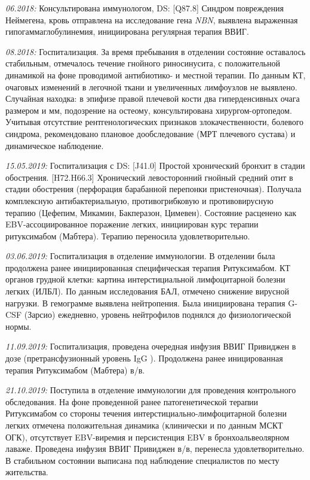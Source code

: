\documentclass[a4paper,14pt]{extarticle}
\newcommand{\gramm}{г}
\newcommand{\grammliter}{г/л}
\newcommand{\mugpkg}{мкг/кг}
\newcommand{\mg}{мг}
\newcommand{\mm}{мм}
\newcommand{\genename}[1]{\textit{#1}}
\newcommand{\pdate}[1]{\emph{#1:} }
\newcommand{\DS}[2]{[#2] #1}
\begin{document}
\pdate{06.2018} Консультирована иммунологом, DS: \DS{Синдром повреждения Неймегена}{Q87.8}, кровь отправлена на исследование гена \genename{NBN}, выявлена выраженная гипогаммаглобулинемия, инициирована регулярная терапия ВВИГ. 

\pdate{08.2018} Госпитализация. За время пребывания в отделении состояние оставалось стабильным, отмечалось течение гнойного риносинусита, с положительной динамикой на фоне проводимой антибиотико- и местной терапии. По данным КТ, очаговых изменений в легочной ткани и увеличенных лимфоузлов не выявлено. Случайная находка: в эпифизе правой плечевой кости два гиперденсивных очага размером \numprint[\mm]{5} и \numprint[\mm]{2} мм, подозрение на остеому, консультирована хирургом-ортопедом. Учитывая отсутствие рентгенологических признаков злокачественности, болевого синдрома, рекомендовано плановое дообследование (МРТ плечевого сустава) и динамическое наблюдение.

\pdate{15.05.2019} Госпитализация с DS: \DS{Простой хронический бронхит в стадии обострения}{J41.0}. \DS{Хронический левосторонний гнойный средний отит в стадии обострения (перфорация барабанной перепонки пристеночная)}{H72.H66.3}. Получала комплексную антибактериальную, противогрибковую и противовирусную терапию (Цефепим, Микамин, Бакперазон, Цимевен). Состояние расценено как EBV-ассоциированное поражение легких, инициирован курс терапии ритуксимабом (Мабтера). Терапию переносила удовлетворительно.

\pdate{03.06.2019} Госпитализация в отделение иммунологии. В отделении была продолжена ранее инициированная специфическая терапия Ритуксимабом. КТ органов грудной клетки: картина интерстициальной лимфоцитарной болезни легких (ИЛБЛ). По данным исследования БАЛ, отмечено снижение вирусной нагрузки. В гемограмме выявлена нейтропения. Была инициирована терапия G-CSF (Зарсио) \numprint[\mugpkg]{3} ежедневно, уровень нейтрофилов поднялся до физиологической нормы.

\pdate{11.09.2019} Госпитализация, проведена очередная инфузия ВВИГ Привиджен в дозе \numprint[\gramm]{10} (претрансфузионный уровень IgG \numprint[\grammliter]{5.8}). Продолжена ранее иницированная терапия Ритуксимабом (Мабтера) \numprint[\mg]{250} в/в. 

\pdate{21.10.2019} Поступила в отделение иммунологии для проведения контрольного обследования. На фоне проведенной ранее патогенетической терапии Ритуксимабом со стороны течения интерстициально\hyp{}лимфоцитарной болезни легких отмечена положительная динамика (клинически и по данным МСКТ ОГК), отсутствует EBV-виремия и персистенция EBV в бронхоальвеолярном лаваже. Проведена инфузия ВВИГ Привиджен \numprint[\gramm]{7,5} в/в, перенесла удовлетворительно. В стабильном состоянии выписана под наблюдение специалистов по месту жительства.
\end{document}
